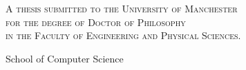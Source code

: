 \begin{titlepage}
	
	
	\begin{center}
		
		\vspace*{1.0in}
		
		{\LARGE\textbf{\thesistitle}}
		
		\vfill
		
		\textsc{A thesis submitted to the University of Manchester\\for the degree of Doctor
		of Philosophy\\in the Faculty of Engineering and Physical Sciences.}
		
		\vfill
		
		\thesisyear
		
		\vfill
		
		\thesisauthor
		
		\vfill
		
		School of Computer Science
		
		\vspace{1.0in}
		
	\end{center}
	
\end{titlepage}
